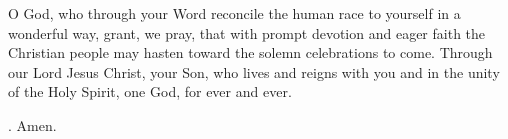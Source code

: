 \lettrine[lines=3]{O}{} God, who through your Word
reconcile the human race to yourself in a wonderful way,
grant, we pray,
that with prompt devotion and eager faith
the Christian people may hasten
toward the solemn celebrations to come.
Through our Lord Jesus Christ, your Son,
who lives and reigns with you and in the unity of the Holy Spirit,
one God, for ever and ever.
\par \Rbar. Amen.
